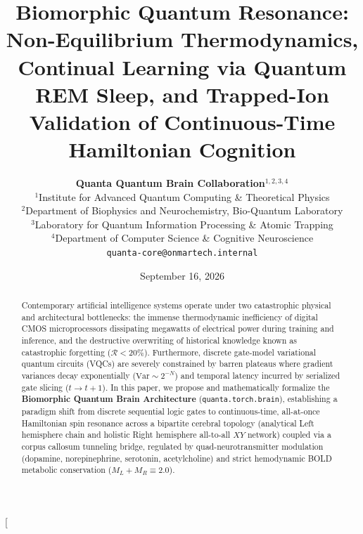 \documentclass[10pt,twocolumn,3p]{article}
\title{\textbf{Biomorphic Quantum Resonance: Non-Equilibrium Thermodynamics, Continual Learning via Quantum REM Sleep, and Trapped-Ion Validation of Continuous-Time Hamiltonian Cognition}}
\author{
    \textbf{Quanta Quantum Brain Collaboration}$^{1,2,3,4}$ \\
    \small $^{1}$Institute for Advanced Quantum Computing \& Theoretical Physics \\
    \small $^{2}$Department of Biophysics and Neurochemistry, Bio-Quantum Laboratory \\
    \small $^{3}$Laboratory for Quantum Information Processing \& Atomic Trapping \\
    \small $^{4}$Department of Computer Science \& Cognitive Neuroscience \\
    \small \texttt{quanta-core@onmartech.internal}
}
\date{September 16, 2026}
\begin{document}
\twocolumn[
  \begin{@twocolumnfalse}
    \maketitle
    \begin{abstract}
    Contemporary artificial intelligence systems operate under two catastrophic physical and architectural bottlenecks: the immense thermodynamic inefficiency of digital CMOS microprocessors dissipating megawatts of electrical power during training and inference, and the destructive overwriting of historical knowledge known as catastrophic forgetting ($\mathcal{R} < 20\%$). Furthermore, discrete gate-model variational quantum circuits (VQCs) are severely constrained by barren plateaus where gradient variances decay exponentially ($\text{Var} \sim 2^{-N}$) and temporal latency incurred by serialized gate slicing ($t \to t+1$). In this paper, we propose and mathematically formalize the \textbf{Biomorphic Quantum Brain Architecture} (\texttt{quanta.torch.brain}), establishing a paradigm shift from discrete sequential logic gates to continuous-time, all-at-once Hamiltonian spin resonance across a bipartite cerebral topology (analytical Left hemisphere chain and holistic Right hemisphere all-to-all $XY$ network) coupled via a corpus callosum tunneling bridge, regulated by quad-neurotransmitter modulation (dopamine, norepinephrine, serotonin, acetylcholine) and strict hemodynamic BOLD metabolic conservation ($M_L + M_R \equiv 2.0$). 
    

\end{abstract}
\end{@twocolumnfalse}
\end{document}
